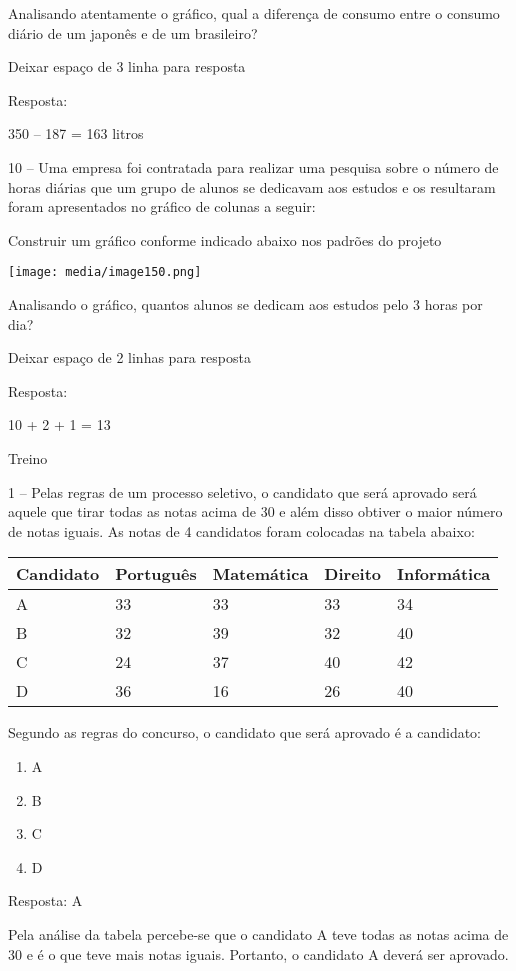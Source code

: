 Analisando atentamente o gráfico, qual a diferença de consumo entre o
consumo diário de um japonês e de um brasileiro?

Deixar espaço de 3 linha para resposta

Resposta:

350 -- 187 = 163 litros

10 -- Uma empresa foi contratada para realizar uma pesquisa sobre o
número de horas diárias que um grupo de alunos se dedicavam aos estudos
e os resultaram foram apresentados no gráfico de colunas a seguir:

Construir um gráfico conforme indicado abaixo nos padrões do projeto

\texttt{[image: media/image150.png]}

Analisando o gráfico, quantos alunos se dedicam aos estudos pelo 3 horas
por dia?

Deixar espaço de 2 linhas para resposta

Resposta:

10 + 2 + 1 = 13

Treino

1 -- Pelas regras de um processo seletivo, o candidato que será aprovado
será aquele que tirar todas as notas acima de 30 e além disso obtiver o
maior número de notas iguais. As notas de 4 candidatos foram colocadas
na tabela abaixo:

\begin{longtable}[]{@{}lllll@{}}
\toprule
Candidato & Português & Matemática & Direito &
Informática\tabularnewline
\midrule
\endhead
A & 33 & 33 & 33 & 34\tabularnewline
B & 32 & 39 & 32 & 40\tabularnewline
C & 24 & 37 & 40 & 42\tabularnewline
D & 36 & 16 & 26 & 40\tabularnewline
\bottomrule
\end{longtable}

Segundo as regras do concurso, o candidato que será aprovado é a
candidato:

\begin{enumerate}
\def\labelenumi{\alph{enumi})}
\item
  A
\item
  B
\item
  C
\item
  D
\end{enumerate}

Resposta: A

Pela análise da tabela percebe-se que o candidato A teve todas as notas
acima de 30 e é o que teve mais notas iguais. Portanto, o candidato A
deverá ser aprovado.

